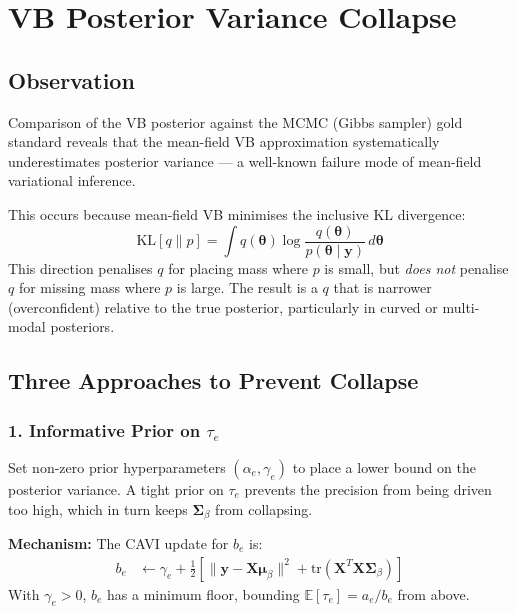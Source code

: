 \documentclass[11pt]{article}
\begin{document}
\bigskip

\section*{VB Posterior Variance Collapse}

\subsection*{Observation}

Comparison of the VB posterior against the MCMC (Gibbs sampler) gold standard reveals that the mean-field VB approximation systematically underestimates posterior variance --- a well-known failure mode of mean-field variational inference.

This occurs because mean-field VB minimises the inclusive KL divergence:
\begin{equation}
  \mathrm{KL}[q \| p] = \int q(\bm{\theta}) \log \frac{q(\bm{\theta})}{p(\bm{\theta}\mid\bm{y})} \, d\bm{\theta}
\end{equation}
This direction penalises $q$ for placing mass where $p$ is small, but \emph{does not} penalise $q$ for missing mass where $p$ is large. The result is a $q$ that is narrower (overconfident) relative to the true posterior, particularly in curved or multi-modal posteriors.

\subsection*{Three Approaches to Prevent Collapse}

\subsubsection*{1. Informative Prior on $\tau_e$}

Set non-zero prior hyperparameters $(\alpha_e, \gamma_e)$ to place a lower bound on the posterior variance. A tight prior on $\tau_e$ prevents the precision from being driven too high, which in turn keeps $\bm{\Sigma}_\beta$ from collapsing.

\textbf{Mechanism:} The CAVI update for $b_e$ is:
\begin{align}
  b_e &\leftarrow \gamma_e + \frac{1}{2}\left[\|\bm{y} - \bm{X}\bm{\mu}_\beta\|^2 + \mathrm{tr}(\bm{X}^T\bm{X}\bm{\Sigma}_\beta)\right]
\end{align}
With $\gamma_e > 0$, $b_e$ has a minimum floor, bounding $\mathbb{E}[\tau_e] = a_e/b_e$ from above.
\end{document}
